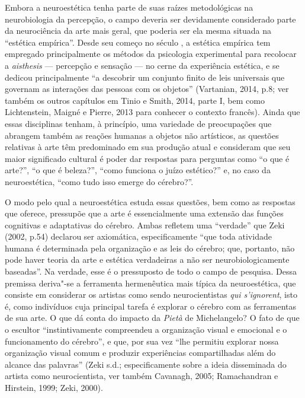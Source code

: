 Embora a neuroestética tenha parte de suas raízes metodológicas na
neurobiologia da percepção, o campo deveria ser devidamente considerado
parte da neurociência da arte mais geral, que poderia ser ela mesma
situada na ``estética empírica''. Desde seu começo no século , a
estética empírica tem empregado principalmente os métodos da psicologia
experimental para recolocar a \emph{aisthesis} --- percepção e sensação
--- no cerne da experiência estética, e se dedicou principalmente ``a
descobrir um conjunto finito de leis universais que governam as
interações das pessoas com os objetos'' (Vartanian, 2014, p.8; ver
também os outros capítulos em Tinio e Smith, 2014, parte I, bem como
Lichtenstein, Maigné e Pierre, 2013 para conhecer o contexto francês).
Ainda que essas disciplinas tenham, à princípio, uma variedade de
preocupações que abrangem também as reações humanas a objetos não
artísticos, as questões relativas à arte têm predominado em sua produção
atual e consideram que seu maior significado cultural é poder dar
respostas para perguntas como ``o que é arte?'', ``o que é beleza?'',
``como funciona o juízo estético?'' e, no caso da neuroestética, ``como
tudo isso emerge do cérebro?''.

O modo pelo qual a neuroestética estuda essas questões, bem como as
respostas que oferece, pressupõe que a arte é essencialmente uma
extensão das funções cognitivas e adaptativas do cérebro. Ambas refletem
uma ``verdade'' que Zeki (2002, p.54) declarou ser axiomática,
especificamente ``que toda atividade humana é determinada pela
organização e as leis do cérebro; que, portanto, não pode haver teoria
da arte e estética verdadeiras a não ser neurobiologicamente baseadas''.
Na verdade, esse é o pressuposto de todo o campo de pesquisa. Dessa
premissa deriva"-se a ferramenta hermenêutica mais típica da
neuroestética, que consiste em considerar os artistas como sendo
neurocientistas \emph{qui s'ignorent}, isto é, como indivíduos cuja
principal tarefa é explorar o cérebro com as ferramentas de sua arte. O
que dá conta do impacto da \emph{Pietà} de Michelangelo? O fato de que o
escultor ``instintivamente compreendeu a organização visual e emocional
e o funcionamento do cérebro'', e que, por sua vez ``lhe permitiu
explorar nossa organização visual comum e produzir experiências
compartilhadas além do alcance das palavras'' (Zeki s.d.;
especificamente sobre a ideia disseminada do artista como
neurocientista, ver também Cavanagh, 2005; Ramachandran e Hirstein,
1999; Zeki, 2000).

